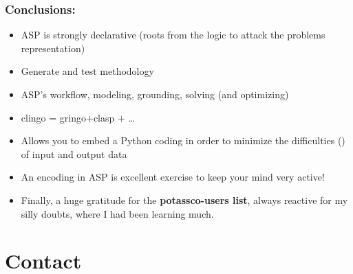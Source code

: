 \documentclass{beamer}
\begin{document}

\begin{frame}[fragile] 
	\frametitle{Conclusions:}
	
\begin{block}{}
\begin{itemize}
  

  \item ASP is strongly declarative (roots from the logic to attack the problems representation)
  
  \item Generate and test methodology
    
  \item ASP's workflow, modeling, grounding, solving
    (and optimizing)
  \item clingo = gringo$+$clasp $+$ \dots

  \item Allows you to embed a Python coding in order to minimize the difficulties (\Frowny) of input and output data
		
   \item An encoding in ASP is excellent exercise to keep your mind very active!

	\item Finally, a huge gratitude for the \textbf{potassco-users list}, always reactive for my silly doubts,  where I had been learning much.
		
	\end{itemize}
\end{block}
\end{frame}



\section*{Contact}
\end{document}
